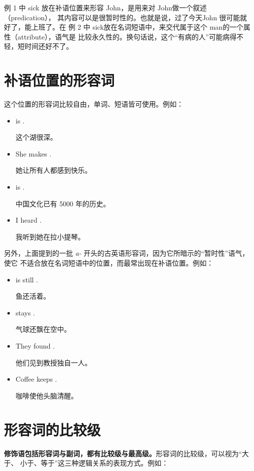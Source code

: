 例 1 中 sick 放在补语位置来形容 John，是用来对 John做一个叙述（predication），
其内容可以是很暂时性的。也就是说，过了今天John 很可能就好了，能上班了。在
例 2 中 sick放在名词短语中，来交代属于这个 man的一个属性（attribute），语气是
比较永久性的。换句话说，这个“有病的人”可能病得不轻，短时间还好不了。

\section{补语位置的形容词}

这个位置的形容词比较自由，单词、短语皆可使用。例如：

\begin{itemize}
\item {} is .

  这个湖很深。
\item She makes  .

她让所有人都感到快乐。
\item {} is .

  中国文化已有 5000 年的历史。
\item I heard  .

  我听到她在拉小提琴。
\end{itemize}

另外，上面提到的一批 \emph{a-} 开头的古英语形容词，因为它所暗示的“暂时性”语气，使它
不适合放在名词短语中的位置，而最常出现在补语位置。例如：
\begin{itemize}
\item  {} is still .

  鱼还活着。
\item  {} stays .

  气球还飘在空中。
\item  They found  .

  他们见到教授独自一人。
\item  Coffee keeps  .

  咖啡使他头脑清醒。
\end{itemize}

\section{形容词的比较级}

\textbf{修饰语包括形容词与副词，都有比较级与最高级。}形容词的比较级，可以视为“大于、
小于、等于”这三种逻辑关系的表现方式。例如：


